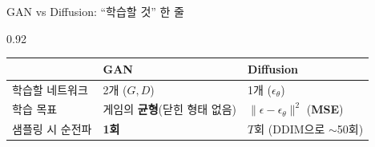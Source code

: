 \begin{frame}{GAN vs Diffusion: ``학습할 것'' 한 줄}
\begin{center}\begin{varwidth}{0.92\textwidth}
  \small
  \begin{tabular}{@{}p{}p{}p{}@{}}
    \toprule
     & GAN & Diffusion \\
    \midrule
    학습할 네트워크 & 2개 ($G, D$) & 1개 ($\epsilon_\theta$) \\
    학습 목표 & 게임의 \textbf{균형}(닫힌 형태 없음) &
      $\lVert\epsilon - \epsilon_\theta\rVert^2$ (\textbf{MSE}) \\
    샘플링 시 순전파 & \textbf{1회} & $T$회 (DDIM으로 $\sim$50회) \\
    \bottomrule
  \end{tabular}
\end{varwidth}\end{center}
\end{frame}
